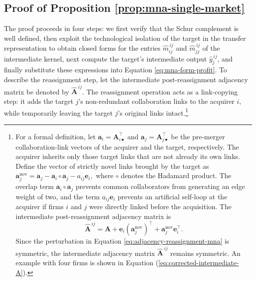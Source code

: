 \subsection{Proof of Proposition \ref{prop:mna-single-market}}
\label{app:proof-mna-single-market}
The proof proceeds in four steps: we first verify that the Schur complement is
well defined, then exploit the technological isolation of the target in the
transfer representation to obtain closed forms for the entries
$\widehat m_{ij}^{\,ij}$ and $\widehat m_{jj}^{\,ij}$ of the intermediate
kernel, next compute the target's intermediate output
$\widehat y_j^{\,ij}$, and finally substitute these expressions into Equation
\eqref{eq:mna-form-profit}.
To describe the reassignment step, let the intermediate post-reassignment adjacency matrix be denoted by $\widehat{\mathbf{A}}^{\,ij}$. The reassignment operation acts as a link-copying step: it adds the target $j$'s non-redundant collaboration links to the acquirer $i$, while temporarily leaving the target $j$'s original links intact.\footnote{For a formal definition, let
$
\mathbf{a}_i
=
\mathbf{A}_{i\bullet}^{\top}$
 and
$\mathbf{a}_j
=
\mathbf{A}_{j\bullet}^{\top}
$
be the pre-merger collaboration-link vectors of the acquirer and the target, respectively. The acquirer inherits only those target links that are not already its own links. Define the vector of strictly novel links brought by the target as
$
\mathbf{a}_{j}^{\text{nov}}
=
\mathbf{a}_j
-
\mathbf{a}_i\circ\mathbf{a}_j
-
a_{ij}\mathbf{e}_i,
$
where $\circ$ denotes the Hadamard product. The overlap term
$\mathbf{a}_i\circ\mathbf{a}_j$ prevents common collaborators from generating an
edge weight of two, and the term $a_{ij}\mathbf{e}_i$ prevents an artificial self-loop
at the acquirer if firms $i$ and $j$ were directly linked before the acquisition. The intermediate post-reassignment adjacency matrix is
\begin{equation}
\widehat{\mathbf{A}}^{\,ij}
=
\mathbf{A}
+
\mathbf{e}_i\left(\mathbf{a}_{j}^{\text{nov}}\right)^{\top}
+
\mathbf{a}_{j}^{\text{nov}}\mathbf{e}_i^{\top}.
\label{eq:adjacency-reassignment-mna}
\end{equation}
Since the perturbation in Equation \eqref{eq:adjacency-reassignment-mna} is symmetric, the intermediate
adjacency matrix $\widehat{\mathbf{A}}^{\,ij}$ remains symmetric. An example with four firms is shown in Equation (\ref{eq:corrected-intermediate-A}).} %

